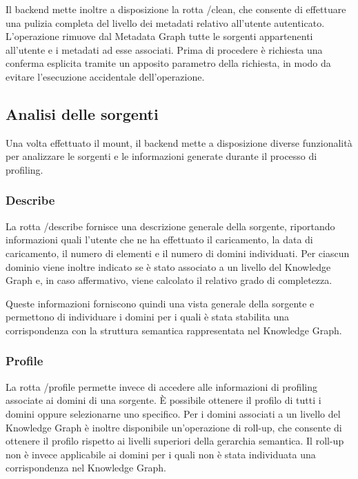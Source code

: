 \documentclass[13.6pt,a4paper]{report}
\begin{document}
\noindent
Il backend mette inoltre a disposizione la rotta \colorbox{gray!15}{/clean}, che consente di effettuare una pulizia completa del livello dei metadati relativo all'utente autenticato. L'operazione rimuove dal Metadata Graph tutte le sorgenti appartenenti all'utente e i metadati ad esse associati. Prima di procedere è richiesta una conferma esplicita tramite un apposito parametro della richiesta, in modo da evitare l'esecuzione accidentale dell'operazione.


\subsection{Analisi delle sorgenti}
Una volta effettuato il mount, il backend mette a disposizione diverse funzionalità per analizzare le sorgenti e le informazioni generate durante il processo di profiling.

\subsubsection*{Describe}
La rotta \colorbox{gray!15}{/describe} fornisce una descrizione generale della sorgente, riportando informazioni quali l'utente che ne ha effettuato il caricamento, la data di caricamento, il numero di elementi e il numero di domini individuati. Per ciascun dominio viene inoltre indicato se è stato associato a un livello del Knowledge Graph e, in caso affermativo, viene calcolato il relativo grado di completezza.

\noindent
Queste informazioni forniscono quindi una vista generale della sorgente e permettono di individuare i domini per i quali è stata stabilita una corrispondenza con la struttura semantica rappresentata nel Knowledge Graph.

\subsubsection*{Profile}
La rotta \colorbox{gray!15}{/profile} permette invece di accedere alle informazioni di profiling associate ai domini di una sorgente. È possibile ottenere il profilo di tutti i domini oppure selezionarne uno specifico. Per i domini associati a un livello del Knowledge Graph è inoltre disponibile un'operazione di roll-up, che consente di ottenere il profilo rispetto ai livelli superiori della gerarchia semantica. Il roll-up non è invece applicabile ai domini per i quali non è stata individuata una corrispondenza nel Knowledge Graph.
\end{document}
